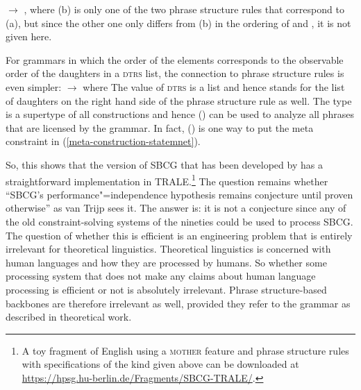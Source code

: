\ex 
{} $\to$ ,  where 
\zl
(b) is only one of the two phrase structure rules that correspond to (a), but since
the other one only differs from (b) in the ordering of  and , it is not
given here.

For grammars in which the order of the elements corresponds to the observable order of the
daughters in a \textsc{dtrs} list, the connection to phrase structure rules is even simpler:
\ea 
{} $\to$  where 
\z
The value of \textsc{dtrs} is a list and hence  stands for the list of daughters on the right
hand side of the phrase structure rule as well. The type  is a supertype of all
constructions and hence () can be used to analyze all phrases that are licensed by the
grammar. In fact, () is one way to put the meta constraint in (\ref{meta-construction-statemnet}).

So, this shows that the version of SBCG that has been developed by \citet{Sag2012a} has a
straightforward implementation in TRALE.\footnote{%
A toy fragment of English using a \textsc{mother} feature and phrase structure rules with specifications
of the kind given above can be downloaded at \url{https://hpsg.hu-berlin.de/Fragments/SBCG-TRALE/}.%
}
The question remains whether ``SBCG's performance"=independence hypothesis remains conjecture until proven otherwise'' as van Trijp sees
it. The answer is: it is not a conjecture since any of the old constraint-solving systems of the
nineties could be used to process SBCG. The question of whether this is efficient is an engineering
problem that is entirely irrelevant for theoretical linguistics. Theoretical linguistics is
concerned with human languages and how they are processed by humans. So whether some processing system
that does not make any claims about human language processing is efficient or not is absolutely
irrelevant. Phrase structure-based backbones are therefore irrelevant as well, provided they refer
to the grammar as described in theoretical work.  

